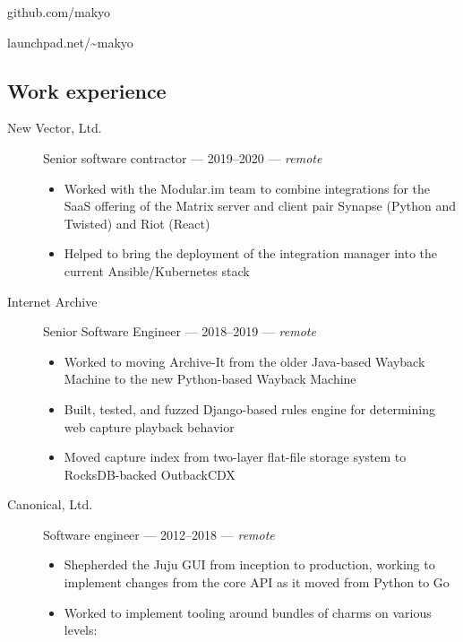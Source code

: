 \noindent github.com/makyo

\noindent launchpad.net/\textasciitilde{}makyo

\newpage

\subsection{Work experience}

\begin{description}
    \item[New Vector, Ltd.]
    Senior software contractor --- 2019--2020 --- \emph{remote}

    \begin{itemize}
        \tightlist
        \item
        Worked with the Modular.im team to combine integrations for the SaaS offering of the Matrix server and client pair Synapse (Python and Twisted) and Riot (React)
        \item
        Helped to bring the deployment of the integration manager into the current Ansible/Kubernetes stack
    \end{itemize}
    \item[Internet Archive]
    Senior Software Engineer --- 2018--2019 --- \emph{remote}

    \begin{itemize}
        \tightlist
        \item
        Worked to moving Archive-It from the older Java-based Wayback Machine to the new Python-based Wayback Machine
        \item
        Built, tested, and fuzzed Django-based rules engine for determining web capture playback behavior
        \item
        Moved capture index from two-layer flat-file storage system to RocksDB-backed OutbackCDX
    \end{itemize}
    \item[Canonical, Ltd.]
    Software engineer --- 2012--2018 --- \emph{remote}

    \begin{itemize}
        \tightlist
        \item
        Shepherded the Juju GUI from inception to production, working to implement changes from the core API as it moved from Python to Go
        \item
        Worked to implement tooling around bundles of charms on various levels:


\end{itemize}
\end{description}

